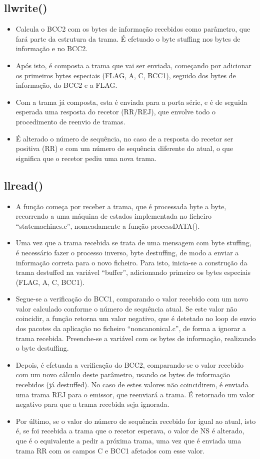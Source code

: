 \documentclass[article, a4paper, 11pt, oneside]{memoir}
\begin{document}
\subsection{llwrite()}
\begin{itemize}
	\item Calcula o BCC2 com os bytes de informação recebidos como parâmetro, que fará parte da estrutura da trama. É efetuado o byte stuffing nos bytes de informação e no BCC2.
	\item Após isto, é composta a trama que vai ser enviada, começando por adicionar os primeiros bytes especiais (FLAG, A, C, BCC1), seguido dos bytes de informação, do BCC2 e a FLAG.
	\item Com a trama já composta, esta é enviada para a porta série, e é de seguida esperada uma resposta do recetor (RR/REJ), que envolve todo o procedimento de reenvio de tramas.
	\item É alterado o número de sequência, no caso de a resposta do recetor ser positiva (RR) e com um número de sequência diferente do atual, o que significa que o recetor pediu uma nova trama.
\end{itemize}

\subsection{llread()}
\begin{itemize}
  	\item A função começa por receber a trama, que é processada byte a byte, recorrendo a uma máquina de estados implementada no ficheiro “statemachines.c”, nomeadamente a função processDATA().
  	\item Uma vez que a trama recebida se trata de uma mensagem com byte stuffing, é necessário fazer o processo inverso, byte destuffing, de modo a enviar a informação correta para o novo ficheiro. Para isto, inicia-se a construção da trama destuffed na variável “buffer”, adicionando primeiro os bytes especiais (FLAG, A, C, BCC1).
  	\item Segue-se a verificação do BCC1, comparando o valor recebido com um novo valor calculado conforme o número de sequência atual. Se este valor não coincidir, a função retorna um valor negativo, que é detetado no loop de envio dos pacotes da aplicação no ficheiro “noncanonical.c”, de forma a ignorar a trama recebida. Preenche-se a variável com os bytes de informação, realizando o byte destuffing.
  	\item Depois, é efetuada a verificação do BCC2, comparando-se o valor recebido com um novo cálculo deste parâmetro, usando os bytes de informação recebidos (já destuffed). No caso de estes valores não coincidirem, é enviada uma trama REJ para o emissor, que reenviará a trama. É retornado um valor negativo para que a trama recebida seja ignorada.
  	\item Por último, se o valor do número de sequência recebido for igual ao atual, isto é, se foi recebida a trama que o recetor esperava, o valor de NS é alterado, que é o equivalente a pedir a próxima trama, uma vez que é enviada uma trama RR com os campos C e BCC1 afetados com esse valor.

\end{itemize}
\end{document}

